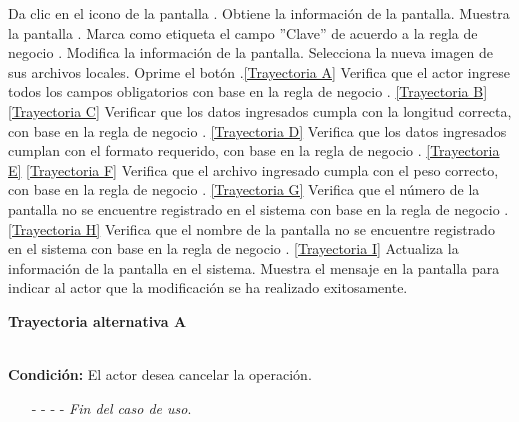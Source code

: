 	\begin{UCtrayectoria}
		\UCpaso[\UCactor] Da clic en el icono \editar de la pantalla .
		\UCpaso[\UCsist] Obtiene la información de la pantalla.
		\UCpaso[\UCsist] Muestra la pantalla . \label{CU11.2-P7}
		\UCpaso[\UCsist] Marca como etiqueta el campo ''Clave'' de acuerdo a la regla de negocio .
		\UCpaso[\UCactor] Modifica la información de la pantalla. \label{CU11.2-P5}
		\UCpaso[\UCactor] Selecciona la nueva imagen de sus archivos locales. \label{CU11.2-P6}
		\UCpaso[\UCactor] Oprime el botón .\hyperlink{CU11-2:TAA}{[Trayectoria A]} 
		\UCpaso[\UCsist] Verifica que el actor ingrese todos los campos obligatorios con base en la regla de negocio . \hyperlink{CU11-2:TAB}{[Trayectoria B]} \hyperlink{CU11-2:TAC}{[Trayectoria C]}
		\UCpaso[\UCsist] Verificar que los datos ingresados cumpla con la longitud correcta, con base en la regla de negocio . \hyperlink{CU11-2:TAD}{[Trayectoria D]}
		\UCpaso[\UCsist] Verifica que los datos ingresados cumplan con el formato requerido, con base en la regla de negocio . \hyperlink{CU11-2:TAE}{[Trayectoria E]} \hyperlink{CU11-2:TAF}{[Trayectoria F]}
		\UCpaso[\UCsist] Verifica que el archivo ingresado cumpla con el peso correcto, con base en la regla de negocio . \hyperlink{CU11-2:TAG}{[Trayectoria G]}
		\UCpaso[\UCsist] Verifica que el número de la pantalla no se encuentre registrado en el sistema con base en la regla de negocio . \hyperlink{CU11-2:TAH}{[Trayectoria H]}
		\UCpaso[\UCsist] Verifica que el nombre de la pantalla no se encuentre registrado en el sistema con base en la regla de negocio . \hyperlink{CU11-2:TAI}{[Trayectoria I]} 
		\UCpaso[\UCsist] Actualiza la información de la pantalla en el sistema.
		\UCpaso[\UCsist] Muestra el mensaje  en la pantalla  para indicar al actor que la modificación se ha realizado exitosamente.
	\end{UCtrayectoria}		
\hypertarget{CU11-2:TAA}{\textbf{Trayectoria alternativa A}}\\
\noindent \textbf{Condición:} El actor desea cancelar la operación.
\begin{enumerate}
	\UCpaso[\UCactor] Solicita cancelar la operación oprimiendo el botón  de la pantalla .
	\UCpaso[\UCsist] Muestra la pantalla .
	\item[- -] - - {\em {Fin del caso de uso}}.%
\end{enumerate}
